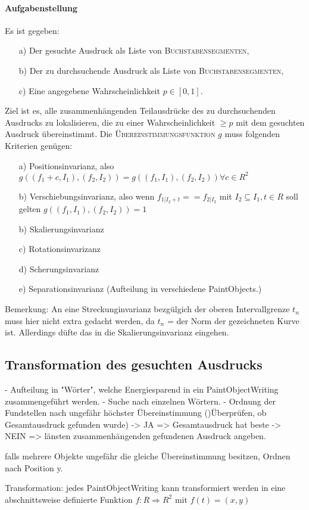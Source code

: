 \documentclass[a4paper,12pt]{article}
\newcommand{\R}{ R}
\begin{document}
\paragraph{Aufgabenstellung}

Es ist gegeben:
\begin{enumerate}
	\item[a)] Der gesuchte Ausdruck als Liste von  \textsc{Buchstabensegmenten},
	\item[b)] Der zu durchsuchende Ausdruck als Liste von  \textsc{Buchstabensegmenten},
	\item[c)] Eine angegebene Wahrscheinlichkeit $p \in [0, 1]$.
\end{enumerate} 
Ziel ist es, alle zusammenhängenden Teilausdrücke des zu durchsuchenden Ausdrucks  zu lokalisieren, die zu einer Wahrscheinlichkeit $\geq p$ mit dem gesuchten Ausdruck übereinstimmt.
Die \textsc{Übereinstimmungsfunktion} $g$ muss folgenden Kriterien genügen:
\begin{enumerate}
	\item[a)] Positionsinvarianz, also $g((f_1 + c, I_1), (f_2, I_2 )) = g((f_1, I_1), (f_2, I_2 ))  \forall c \in \R^2$
	\item[b)] Verschiebungsinvarianz, also wenn $f_{1|I_2 + t} == f_{2|I_2}$ mit $I_2 \subseteq I_1, t \in \R $ soll gelten $g((f_1, I_1), (f_2, I_2)) = 1$
	\item[b)] Skalierungsinvarianz
	\item[c)] Rotationsinvarizanz
	\item[d)] Scherungsinvarianz
	\item[e)] Separationsinvarianz (Aufteilung in verschiedene PaintObjects.)
\end{enumerate}
Bemerkung: An eine Streckunginvarianz bezgülgich der oberen Intervallgrenze $t_n$ muss hier nicht extra gedacht werden, da $t_n$ = der Norm der gezeichneten Kurve ist.
Allerdings düfte das in die Skalierungsinvarianz eingehen.

\subsection{Transformation des gesuchten Ausdrucks}
- Aufteilung in "Wörter", welche Energiesparend in ein PaintObjectWriting zusammengeführt werden.
- Suche nach einzelnen Wörtern.
- Ordnung der Fundstellen nach ungefähr höchster Übereinstimmung
()Überprüfen, ob Gesamtausdruck gefunden wurde)
	-> JA 		=> Gesamtausdruck hat beste
	-> NEIN   => länsten zusammenhängenden gefundenen Ausdruck angeben.
	
	falls mehrere Objekte ungefähr die gleiche Übereinstimmung besitzen, Ordnen nach Position y.
	



Transformation:
jedes PaintObjectWriting kann transformiert werden in eine abschnittsweise definierte Funktion $f: \R \Rightarrow R^2 $ mit $f(t) = (x, y)$
\end{document}
